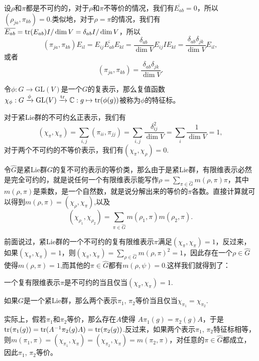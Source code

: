 \para 设$\rho$和$\pi$都是不可约的，对于$\rho$和$\pi$不等价的情况，我们有$\overline{E_{ab}}=0$，所以$\left(\rho_{ja},\pi_{kb}\right)=0$.类似地，对于$\rho=\pi$的情况，我们有$\overline{E_{ab}}=\operatorname{tr}(E_{ab})I/\dim V=\delta_{ab}I/\dim V$，所以
\[
	\left(\pi_{ja},\pi_{kb}\right)E_{il}=E_{ij}\overline{E_{ab}}E_{kl}=\frac{\delta_{ab}}{\dim V}E_{ij}IE_{kl}=\frac{\delta_{ab}\delta_{jk}}{\dim V}E_{il},
\]
或者
\[
	\left(\pi_{ja},\pi_{kb}\right)=\frac{\delta_{ab}\delta_{jk}}{\dim V}.
\]

\para 令$\phi:G\to \mathrm{GL}(V)$是一个$G$的复表示，那么复值函数$\chi_\phi:G\xrightarrow{\phi}\mathrm{GL}(V)\xrightarrow{\operatorname{tr}}\mathbb{C}:g\mapsto \operatorname{tr}(\phi(g))$被称为$\phi$的特征标。

对于紧Lie群的不可约幺正表示，我们有
\[
(\chi_\pi, \chi_\pi)=\sum_{i,j}(\pi_{ii},\pi_{jj})=\sum_{i,j}\frac{\delta_{ij}^2}{\dim V}=\sum_{i}\frac{1}{\dim V}=1,
\]
对于两个不可约的不等价表示，我们有$(\chi_\pi, \chi_\rho)=0$.

令$\hat{G}$是紧Lie群$G$的复不可约表示的等价类，那么由于是紧Lie群，有限维表示必然是完全可约的，就是说任何一个有限维表示能写作$\rho=\sum_{\pi\in\hat{G}}m(\rho,\pi)\pi$，其中$m(\rho,\pi)$是乘数，是一个自然数，就是说分解出来的等价的$\pi$各数。直接计算就可以得到$m(\rho,\pi)=(\chi_\rho,\chi_\pi)$,以及
\[
	(\chi_{\rho_1},\chi_{\rho_2})=\sum_{\pi\in\hat{G}}m(\rho_1,\pi)m(\rho_2,\pi).
\]

前面说过，紧Lie群的一个不可约的复有限维表示$\pi$满足$(\chi_\pi, \chi_\pi)=1$，反过来，如果$(\chi_\pi, \chi_\pi)=1$，则$(\chi_{\pi},\chi_{\pi})=\sum_{\rho\in\hat{G}}m(\rho,\pi)^2=1$，因此存在一个$\rho\in\hat{G}$使得$m(\rho,\pi)=1$,而其他的$\pi\in\hat{G}$都有$m(\rho,\psi)=0$.这样我们就得到了：

\para 一个复有限维表示$\pi$是不可约的当且仅当$(\chi_{\pi},\chi_{\pi})=1$.

\pro 如果$G$是一个紧Lie群，那么两个表示$\pi_1$, $\pi_2$等价当且仅当$\chi_{\pi_1}=\chi_{\pi_2}$.

实际上，假若$\pi_1$和$\pi_2$等价，那么存在$A$使得
$A\pi_1(g)=\pi_2(g)A$，于是$\operatorname{tr}(\pi_1(g))=\operatorname{tr}(A^{-1}\pi_2(g)A)=\operatorname{tr}(\pi_2(g))$.反过来，如果两个表示$\pi_1$, $\pi_2$特征标相等，则$	m(\pi_1,\pi)=(\chi_{\pi_1},\chi_\pi)=(\chi_{\pi_2},\chi_\pi)=m(\pi_2,\pi)$，对任意的$\pi\in\hat{G}$都成立，因此$\pi_1$, $\pi_2$等价。
